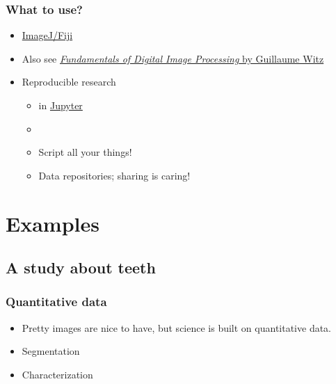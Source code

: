  \begin{frame}
 	\frametitle{What to use?}
 	\begin{itemize}
 		\item \href{http://fiji.sc/}{ImageJ/Fiji}~\cite{Schindelin2012}
 		\item Also see \href{https://ilias.unibe.ch/goto_ilias3_unibe_sess_2774485.html}{\emph{Fundamentals of Digital Image Processing} by Guillaume Witz}
 		\item Reproducible research
 		\begin{itemize}
 			\item \href{https://www.python.org/}{\faPython} in \href{https://jupyter.org/}{Jupyter}~\cite{Kluyver2016}
 			\item \href{https://git-scm.com/}{\faGit}
 			\item Script all your things!
 			\item Data repositories; \ie{} sharing is caring!
 		\end{itemize}
 	\end{itemize}
 \end{frame}

\section{Examples}
\subsection{A study about teeth}
\begin{frame}
	\frametitle{Quantitative data}
	\begin{itemize}
		\item Pretty images are nice to have, but science is built on quantitative data.
		\item Segmentation
		\item Characterization
	\end{itemize}	
\end{frame}

